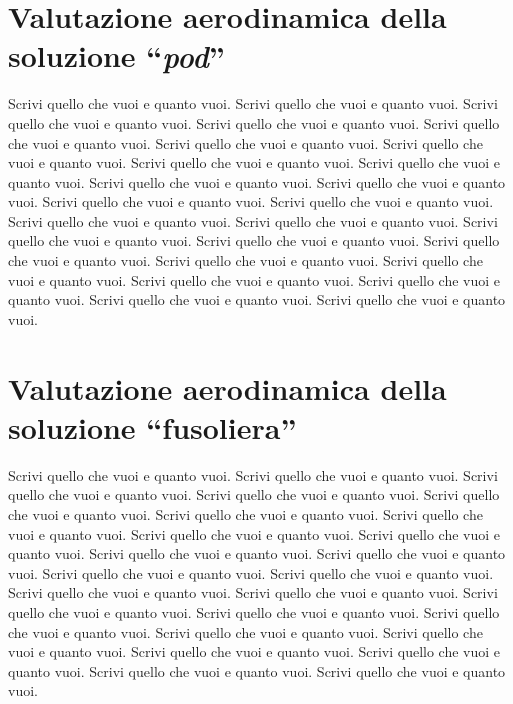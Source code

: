 \documentclass[10pt,a4paper,twoside]{memoir} %
\begin{document}
\section{Valutazione aerodinamica della soluzione ``\textit{pod}''}
\label{subsection:Valutazione aerodinamica della soluzione pod}
Scrivi quello che vuoi e quanto vuoi. Scrivi quello che vuoi e quanto vuoi.
Scrivi quello che vuoi e quanto vuoi. Scrivi quello che vuoi e quanto vuoi.
Scrivi quello che vuoi e quanto vuoi. Scrivi quello che vuoi e quanto vuoi.
Scrivi quello che vuoi e quanto vuoi. Scrivi quello che vuoi e quanto vuoi.
Scrivi quello che vuoi e quanto vuoi. Scrivi quello che vuoi e quanto vuoi.
Scrivi quello che vuoi e quanto vuoi. Scrivi quello che vuoi e quanto vuoi.
Scrivi quello che vuoi e quanto vuoi. Scrivi quello che vuoi e quanto vuoi.
Scrivi quello che vuoi e quanto vuoi. Scrivi quello che vuoi e quanto vuoi.
Scrivi quello che vuoi e quanto vuoi. Scrivi quello che vuoi e quanto vuoi.
Scrivi quello che vuoi e quanto vuoi. Scrivi quello che vuoi e quanto vuoi.
Scrivi quello che vuoi e quanto vuoi. Scrivi quello che vuoi e quanto vuoi.
Scrivi quello che vuoi e quanto vuoi. Scrivi quello che vuoi e quanto vuoi.

\section{Valutazione aerodinamica della soluzione ``fusoliera''}
\label{subsection:Valutazione aerodinamica della soluzione fusoliera}
Scrivi quello che vuoi e quanto vuoi. Scrivi quello che vuoi e quanto vuoi.
Scrivi quello che vuoi e quanto vuoi. Scrivi quello che vuoi e quanto vuoi.
Scrivi quello che vuoi e quanto vuoi. Scrivi quello che vuoi e quanto vuoi.
Scrivi quello che vuoi e quanto vuoi. Scrivi quello che vuoi e quanto vuoi.
Scrivi quello che vuoi e quanto vuoi. Scrivi quello che vuoi e quanto vuoi.
Scrivi quello che vuoi e quanto vuoi. Scrivi quello che vuoi e quanto vuoi.
Scrivi quello che vuoi e quanto vuoi. Scrivi quello che vuoi e quanto vuoi.
Scrivi quello che vuoi e quanto vuoi. Scrivi quello che vuoi e quanto vuoi.
Scrivi quello che vuoi e quanto vuoi. Scrivi quello che vuoi e quanto vuoi.
Scrivi quello che vuoi e quanto vuoi. Scrivi quello che vuoi e quanto vuoi.
Scrivi quello che vuoi e quanto vuoi. Scrivi quello che vuoi e quanto vuoi.
Scrivi quello che vuoi e quanto vuoi. Scrivi quello che vuoi e quanto vuoi.

\end{document}
